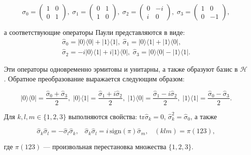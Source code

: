 \documentclass[a4paper]{report}
\begin{document}
$${
    \sigma_0 = \begin{pmatrix}1 & 0 \\ 0 & 1\end{pmatrix},\;
    \sigma_1 = \begin{pmatrix}0 & 1 \\ 1 & 0\end{pmatrix},\;
    \sigma_2 = \begin{pmatrix}0 & -i \\ i & 0\end{pmatrix},\;
    \sigma_3 = \begin{pmatrix}1 & 0 \\ 0 & -1\end{pmatrix},
}$$

\noindent а соответствующие операторы Паули представляются в виде:
\begin{align*}
    \hat{\sigma}_0 = |0\rangle\langle0| + |1\rangle\langle1|,\;
    \hat{\sigma}_1 = |0\rangle\langle1| + |1\rangle\langle0|,     \\
    \hat{\sigma}_2 = -i|0\rangle\langle1| + i|1\rangle\langle0|,\;
    \hat{\sigma}_3 = |0\rangle\langle0| - |1\rangle\langle1|.
\end{align*}

\noindent Эти операторы одновременно эрмитовы и унитарны, а также образуют базис в ${\mathcal{H}}$. Обратное преобразование выражается следующим образом:

$${
    |0\rangle\langle0| = \frac{\hat{\sigma}_0 + \hat{\sigma}_3}{2},\;
    |0\rangle\langle1| = \frac{\hat{\sigma}_1 + i\hat{\sigma}_2}{2},\;
    |1\rangle\langle0| = \frac{\hat{\sigma}_1 - i\hat{\sigma}_2}{2},\;
    |1\rangle\langle1| = \frac{\hat{\sigma}_0 - \hat{\sigma}_3}{2}.
}$$

Для ${k, l, m \in \{1,2,3\}}$ выполняются свойства:
${\mathrm{tr}\hat{\sigma}_k = 0}$,
${\hat{\sigma}^2_k = \hat{\sigma}_0}$, а также

\begin{equation}\label{eq2}
    \hat{\sigma}_k\hat{\sigma}_l = -\hat{\sigma}_l\hat{\sigma}_k, \;\;\;
    \hat{\sigma}_k\hat{\sigma}_l = i\,\mathrm{sign}(\pi)\hat{\sigma}_m, \;\;\;
    (klm) = \pi(123),
\end{equation}

\noindent где ${\pi(123)}$ — произвольная перестановка множества ${\{1,2,3\}}$.
\end{document}
